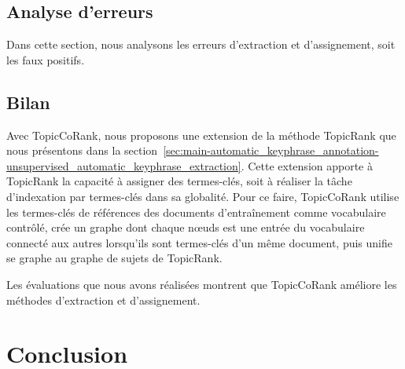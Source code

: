     \subsection{Analyse d'erreurs}
    \label{subsec:main-automatic_keyphrase_annotation-supervised_automatic_keyphrase_annotation-error_analysis}
      Dans cette section, nous analysons les erreurs d'extraction et
      d'assignement, soit les faux positifs. \TODO{\dots}

    \subsection{Bilan}
    \label{subsec:main-automatic_keyphrase_annotation-supervised_automatic_keyphrase_annotation-conclusion}
      Avec TopicCoRank, nous proposons une extension de la méthode TopicRank que
      nous présentons dans la
      section~\ref{sec:main-automatic_keyphrase_annotation-unsupervised_automatic_keyphrase_extraction}.
      Cette extension apporte à TopicRank la capacité à assigner des
      termes-clés, soit à réaliser la tâche d'indexation par termes-clés dans
      sa globalité. Pour ce faire, TopicCoRank utilise les termes-clés de
      références des documents d'entraînement comme vocabulaire contrôlé, crée
      un graphe dont chaque n\oe{}uds est une entrée du vocabulaire connecté aux
      autres lorsqu'ils sont termes-clés d'un même document, puis unifie se
      graphe au graphe de sujets de TopicRank.

      Les évaluations que nous avons réalisées montrent que TopicCoRank améliore
      les méthodes d'extraction et d'assignement. 


  \section{Conclusion}
  \label{sec:main-automatic_keyphrase_annotation-conclusion}

